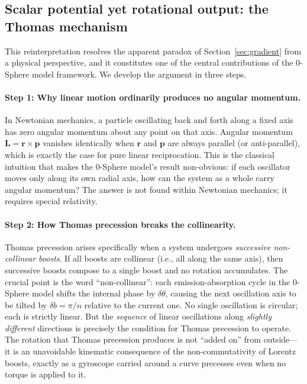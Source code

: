 \documentclass[%
 reprint, amsmath,amssymb, aps, prb, ]{revtex4-2}
\numberwithin{equation}{section}
\newcommand{\iphase}{\theta}
\begin{document}
\subsection{Scalar potential yet rotational output: the Thomas mechanism}

This reinterpretation resolves the apparent paradox of Section~\ref{sec:gradient} from a physical perspective, and it constitutes one of the central contributions of the 0-Sphere model framework.
We develop the argument in three steps.

\paragraph{Step 1: Why linear motion ordinarily produces no angular momentum.}
In Newtonian mechanics, a particle oscillating back and forth along a fixed axis has zero angular momentum about any point on that axis.
Angular momentum $\mathbf{L} = \mathbf{r} \times \mathbf{p}$ vanishes identically when $\mathbf{r}$ and $\mathbf{p}$ are always parallel (or anti-parallel), which is exactly the case for pure linear reciprocation.
This is the classical intuition that makes the 0-Sphere model's result non-obvious: if each oscillator moves only along its own radial axis, how can the system as a whole carry angular momentum?
The answer is not found within Newtonian mechanics; it requires special relativity.

\paragraph{Step 2: How Thomas precession breaks the collinearity.}
Thomas precession arises specifically when a system undergoes \emph{successive non-collinear boosts}.
If all boosts are collinear (i.e., all along the same axis), then successive boosts compose to a single boost and no rotation accumulates.
The crucial point is the word ``non-collinear'': each emission-absorption cycle in the 0-Sphere model shifts the internal phase by $\delta\iphase$, causing the next oscillation axis to be tilted by $\delta b = \pi/n$ relative to the current one.
No single oscillation is circular; each is strictly linear.
But the \emph{sequence} of linear oscillations along \emph{slightly different} directions is precisely the condition for Thomas precession to operate.
The rotation that Thomas precession produces is not ``added on'' from outside---it is an unavoidable kinematic consequence of the non-commutativity of Lorentz boosts, exactly as a gyroscope carried around a curve precesses even when no torque is applied to it.
\end{document}
